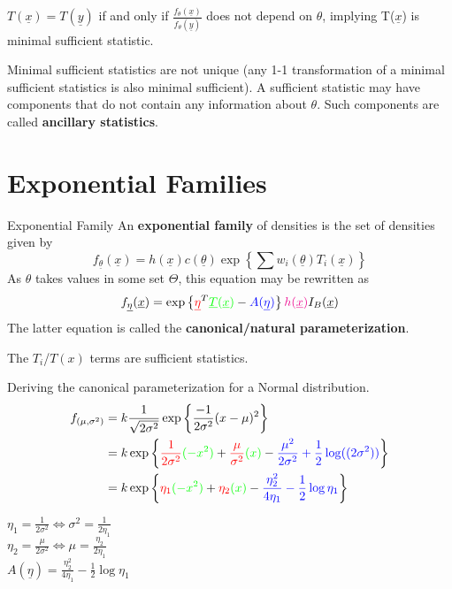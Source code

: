 \documentclass[11pt,fleqn]{book} %
\begin{document}
\begin{theorem} $T(\underline{x}) = T(\underline{y})$ if and only if $\frac{f_\theta (\underline{x})}{f_\theta(\underline{y})}$ does not depend on $\theta$, implying T($\underline{x}$) is minimal sufficient statistic. 
\end{theorem}

\begin{remark}
	Minimal sufficient statistics are not unique (any 1-1 transformation of a minimal sufficient statistics is also minimal sufficient). A sufficient statistic may have components that do not contain any information about $\theta$. Such components are called \textbf{ancillary statistics}.
\end{remark}

\section{Exponential Families}

	\begin{definition}{Exponential Family} An \textbf{exponential family} of densities is the set of densities given by 
	$$f_{\underline{\theta}}(\underline{x})= h(\underline{x})c(\underline{\theta})\exp\left\{\sum w_i(\underline{\theta})T_i(\underline{x})\right\} $$
	As $\theta$ takes values in some set $\Theta$, this equation may be rewritten as
	$$f_{\underline{\eta}}(\underline{x})= \exp\left\{\textcolor{red}{\underline{\eta}}^T\textcolor{green}{\underline{T}(\underline{x})}-\textcolor{blue}{A(\underline{\eta})}\right\}\textcolor{magenta}{h(\underline{x})} I_B(\underline{x}) $$
	The latter equation is called the \textbf{canonical/natural parameterization}.
	\end{definition}

	\begin{remark}
		The $T_i$/$T(x)$ terms are sufficient statistics.
	\end{remark}

	\begin{example}
		Deriving the canonical parameterization for a Normal distribution.
		\begin{align*}
			f_{(\mu,\sigma^2)} &= k \frac{1}{\sqrt{2\sigma^2}}\exp\left\{\frac{-1}{2\sigma^2}(x-\mu)^2 \right\}\\
			&= k \exp\left\{\textcolor{red}{\frac{1}{2\sigma^2}} \textcolor{green}{(-x^2)} + \textcolor{red}{\frac{\mu}{\sigma^2}} \textcolor{green}{(x)} - \textcolor{blue}{\frac{\mu^2}{2\sigma^2}+\frac{1}{2}\log((2\sigma^2))} \right\}\\
			&= k \exp\left\{\textcolor{red}{\eta_1} \textcolor{green}{(-x^2)} + \textcolor{red}{\eta_2} \textcolor{green}{(x)} - \textcolor{blue}{\frac{\eta_2^2}{4\eta_1} - \frac{1}{2}\log\eta_1 } \right\}
		\end{align*}

		$\eta_1 = \frac{1}{2\sigma^2} \Leftrightarrow \sigma^2 = \frac{1}{2\eta_1}$\\
		$\eta_2 = \frac{\mu}{2\sigma^2} \Leftrightarrow \mu = \frac{\eta_2}{2\eta_1}$\\
		$A(\underline{\eta})= \frac{\eta_2^2}{4\eta_1} - \frac{1}{2}\log\eta_1 $

	\end{example}
\end{document}
